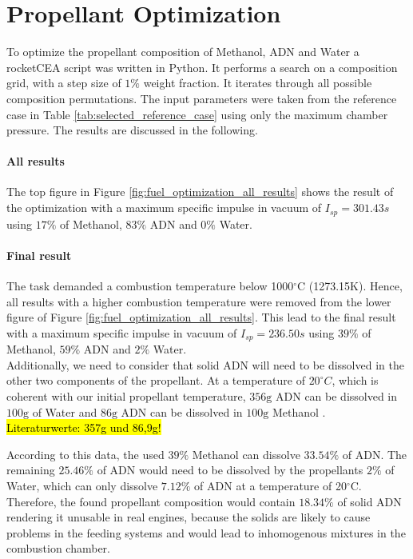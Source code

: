 \documentclass[12pt]{article}
\begin{document}
\section{Propellant Optimization}
\label{chap:task_b3}
To optimize the propellant composition of Methanol, ADN and Water a rocketCEA script was written in Python. It performs a search on a composition grid, with a step size of $1\%$ weight fraction. It iterates through all possible composition permutations. The input parameters were taken from the reference case in Table \ref{tab:selected_reference_case} using only the maximum chamber pressure. The results are discussed in the following.

\paragraph{All results}
The top figure in Figure \ref{fig:fuel_optimization_all_results} shows the result of the optimization with a maximum specific impulse in vacuum of $I_{sp}=301.43s$ using $17\%$ of Methanol, $83\%$ ADN and $0\%$ Water.

\paragraph{Final result}
The task demanded a combustion temperature below 1000$^\circ$C (1273.15K). Hence, all results with a higher combustion temperature were removed from the lower figure of Figure \ref{fig:fuel_optimization_all_results}. This lead to the final result with a maximum specific impulse in vacuum of $I_{sp}=236.50s$ using $39\%$ of Methanol, $59\%$ ADN and $2\%$ Water.\\

Additionally, we need to consider that solid ADN will need to be dissolved in the other two components of the propellant. At a temperature of $20^\circ C$, which is coherent with our initial propellant temperature, $356\text{g}$ ADN can be dissolved in $100\text{g}$ of Water and $86\text{g}$ ADN can be dissolved in $100\text{g}$ Methanol \cite{Larsson2011}.\\

\hl{Literaturwerte: 357g und 86,9g!}

According to this data, the used $39\%$ Methanol can dissolve $33.54\%$ of ADN. The remaining $25.46\%$ of ADN would need to be dissolved by the propellants $2\%$ of Water, which can only dissolve $7.12\%$ of ADN at a temperature of 20$^\circ$C. Therefore, the found propellant composition would contain $18.34\%$ of solid ADN rendering it unusable in real engines, because the solids are likely to cause problems in the feeding systems and would lead to inhomogenous mixtures in the combustion chamber.\\
\end{document}
